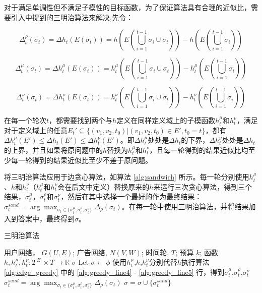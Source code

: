 对于满足单调性但不满足子模性的目标函数，为了保证算法具有合理的近似比，需要引入\parencite{sandwich}中提到的三明治算法来解决,先令：

\begin{equation}
\Delta_t^\rho(\sigma_t)=\Delta h_t(E(\sigma_t))=h(E(\bigcup_{i=1}^{t-1}{\sigma_i} \cup \sigma_t)) - h(E(\bigcup_{i=1}^{t-1}{\sigma_i}))
\end{equation}

\begin{equation}
\Delta_t^\mu(\sigma_t)=\Delta h_t^\mu(E(\sigma_t))=h_t^\mu(E(\bigcup_{i=1}^{t-1}{\sigma_i} \cup \sigma_t)) - h_t^\mu(E(\bigcup_{i=1}^{t-1}{\sigma_i}))
\end{equation}

\begin{equation}
\Delta_t^\nu(\sigma_t)=\Delta h_t^\nu(E(\sigma_t))=h_t^\nu(E(\bigcup_{i=1}^{t-1}{\sigma_i} \cup \sigma_t)) - h_t^\nu(E(\bigcup_{i=1}^{t-1}{\sigma_i}))
\end{equation}

在每一个轮次$t$，都需要找到两个与$h$定义在同样定义域上的子模函数$h_t^\mu$和$h_t^\nu$，满足对于定义域上的任意$E_t' \subseteq \{(v_1,v_2,t_0)|(v_1,v_2,t_0)\in E',t_0=t\}$，都有$\Delta h_t^\mu(E') \le \Delta h_t(E') \le \Delta h_t^\nu(E')$。即$\Delta h_t^\mu$处处是$\Delta h_t$的下界，$\Delta h_t^\nu$处处是$\Delta h_t$的上界，并且如果将原问题中的$h$替换为$h_t^\mu$和$h_t^\nu$，且每一轮得到的结果近似比均至少每一轮得到的结果近似比至少不差于原问题。

将三明治算法应用于边贪心算法，如算法 \ref{alg:sandwich} 所示。每一轮分别使用$h_t^\mu$、$h$和$h_t^\nu$（$h_t^\mu$和$h_t^\nu$会在后文中定义）替换原来的$h$来运行三次贪心算法，得到三个结果，$\sigma_t^\mu$，$\sigma_t^\rho$和$\sigma_t^\nu$，然后在其中选择一个最好的作为最终结果：$\sigma_t^{sand}=\arg\max_{\sigma_t \in \{\sigma_t^\mu,\sigma_t^\rho,\sigma_t^\nu\}}\Delta_\rho(\sigma_t)$。在每一轮中使用三明治算法，并将结果加入到答案中，最终得到$\sigma$。

\begin{algorithm}
    \caption{三明治算法\label{alg:sandwich}} 
    \begin{algorithmic}[1]
        \REQUIRE 用户网络， $G(U,E)$; 广告网络, $N(V,W)$; 时间轮, $T$; 预算 $k$; 函数 $h,h_t^\mu,h_t^\nu:2^{|E|} \times T \to \mathbb{R} $
        \ENSURE $\sigma$
        \STATE Let $\sigma \gets \phi$
            \STATE 使用$h_t^\mu$,$h$,$h_t^\nu$分别代替$h$执行算法 \ref{alg:edge_greedy} 中的 \ref{alg:greedy_line4} - \ref{alg:greedy_line5} 行，得到$\sigma_t^\mu$,$\sigma_t^\rho$,$\sigma_t^\nu$
            \STATE $\sigma_t^{sand}=\arg\max_{\sigma_t \in \{\sigma_t^\mu,\sigma_t^\rho,\sigma_t^\nu\}}\Delta_\rho(\sigma_t)$
            \STATE $\sigma = \sigma \cup \{\sigma_t^{sand}\}$
        \ENDFOR
    \end{algorithmic}
\end{algorithm}

